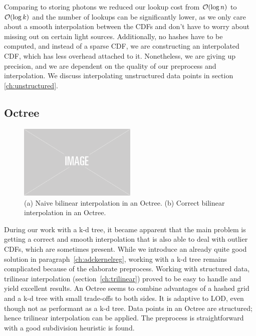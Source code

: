 Comparing to storing photons we reduced our lookup cost from $\mathcal{O}(\log n)$ to $\mathcal{O}(\log k)$ and the number of lookups can be significantly lower, as we only care about a smooth interpolation between the CDFs and don't have to worry about missing out on certain light sources. Additionally, no hashes have to be computed, and instead of a sparse CDF, we are constructing an interpolated CDF, which has less overhead attached to it. Nonetheless, we are giving up precision, and we are dependent on the quality of our preprocess and interpolation. We discuss interpolating unstructured data points in section \ref{ch:unstructured}.

\subsection{Octree}
\label{ch:octree}

\begin{figure}
    \centering
    \includegraphics[width=0.5\textwidth]{figures/img-placeholder.png}
    \caption{(a) Naive bilinear interpolation in an Octree. (b) Correct bilinear interpolation in an Octree.}
    \label{fig:trilinearoctree}
\end{figure}

During our work with a k-d tree, it became apparent that the main problem is getting a correct and smooth interpolation that is also able to deal with outlier CDFs, which are sometimes present. While we introduce an already quite good solution in paragraph~\ref{ch:adckernelreg}, working with a k-d tree remains complicated because of the elaborate preprocess. Working with structured data, trilinear interpolation (section~\ref{ch:trilinear}) proved to be easy to handle and yield excellent results. An Octree seems to combine advantages of a hashed grid and a k-d tree with small trade-offs to both sides. It is adaptive to LOD, even though not as performant as a k-d tree. Data points in an Octree are structured; hence trilinear interpolation can be applied. The preprocess is straightforward with a good subdivision heuristic is found.

